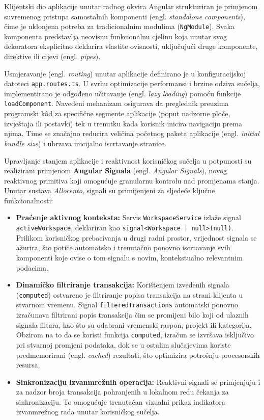 \documentclass[a4paper,12pt,oneside]{article}
\begin{document}
	Klijentski dio aplikacije unutar radnog okvira Angular strukturiran je primjenom suvremenog pristupa samostalnih komponenti (engl. \textit{standalone components}), čime je uklonjena potreba za tradicionalnim modulima (\texttt{NgModule}). Svaka komponenta predstavlja neovisnu funkcionalnu cjelinu koja unutar svog dekoratora eksplicitno deklarira vlastite ovisnosti, uključujući druge komponente, direktive ili cijevi (engl. \textit{pipes}).
	
	Usmjeravanje (engl. \textit{routing}) unutar aplikacije definirano je u konfiguracijskoj datoteci \texttt{app.routes.ts}. U svrhu optimizacije performansi i brzine odziva sučelja, implementirano je odgođeno učitavanje (engl. \textit{lazy loading}) pomoću funkcije \texttt{loadComponent}. Navedeni mehanizam osigurava da preglednik preuzima programski kôd za specifične segmente aplikacije (poput nadzorne ploče, izvještaja ili postavki) tek u trenutku kada korisnik inicira navigaciju prema njima. Time se značajno reducira veličina početnog paketa aplikacije (engl. \textit{initial bundle size}) i ubrzava inicijalno iscrtavanje stranice.
	
	Upravljanje stanjem aplikacije i reaktivnost korisničkog sučelja u potpunosti su realizirani primjenom \textbf{Angular Signala} (engl. \textit{Angular Signals}), novog reaktivnog primitiva koji omogućuje granularnu kontrolu nad promjenama stanja. Unutar sustava \textit{Allocento}, signali su primijenjeni za sljedeće ključne funkcionalnosti:
	\begin{itemize}
		\item \textbf{Praćenje aktivnog konteksta:} Servis \texttt{WorkspaceService} izlaže signal \texttt{activeWorkspace}, deklariran kao \texttt{signal<Workspace | null>(null)}. Prilikom korisničkog prebacivanja u drugi radni prostor, vrijednost signala se ažurira, što potiče automatsko i trenutačno ponovno iscrtavanje svih komponenti koje ovise o tom signalu s novim, kontekstualno relevantnim podacima.
		
		\item \textbf{Dinamičko filtriranje transakcija:} Korištenjem izvedenih signala (\texttt{computed}) ostvareno je filtriranje popisa transakcija na strani klijenta u stvarnom vremenu. Signal \texttt{filteredTransactions} automatski ponovno izračunava filtrirani popis transakcija čim se promijeni bilo koji od ulaznih signala filtara, kao što su odabrani vremenski raspon, projekt ili kategorija. Obzirom na to da se koristi funkcija \texttt{computed}, izračun se izvršava isključivo pri stvarnoj promjeni podataka, dok se u ostalim slučajevima koriste predmemorirani (engl. \textit{cached}) rezultati, što optimizira potrošnju procesorskih resursa.
		
		\item \textbf{Sinkronizaciju izvanmrežnih operacija:} Reaktivni signali se primjenjuju i za nadzor broja transakcija pohranjenih u lokalnom redu čekanja za sinkronizaciju. To omogućuje trenutačan vizualni prikaz indikatora izvanmrežnog rada unutar korisničkog sučelja.
	\end{itemize}
		
\end{document}
